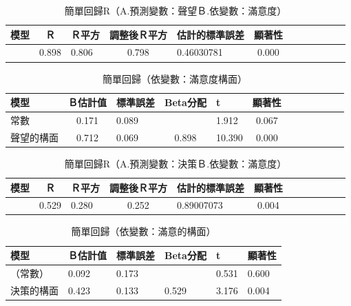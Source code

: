 \begin{table}[htb]
\caption{簡單回歸R（A.預測變數：聲望Ｂ.依變數：滿意度）}
\label{tab:HR6}
\centering
\renewcommand{\arraystretch}{1.2} %
\arrayrulewidth=1pt               %
\tabcolsep=10pt                   %
\begin{tabular}[t]{lclclclclclc|}  %
\hline
 模型&Ｒ&Ｒ平方&調整後Ｒ平方&估計的標準誤差&顯著性\\
\hline
&0.898&0.806&0.798&0.46030781&0.000\\
\hline
\end{tabular}
\end{table}

\begin{table}[htb]
\caption{簡單回歸（依變數：滿意度構面）}
\label{tab:H6}
\centering
\renewcommand{\arraystretch}{1.2} %
\arrayrulewidth=1pt               %
\tabcolsep=10pt                   %
\begin{tabular}[t]{lclclclclclc|}  %
\hline
 模型&Ｂ估計值&標準誤差&Beta分配&t&顯著性\\
\hline
常數&0.171&0.089&&1.912&0.067 \\
聲望的構面 & 0.712 & 0.069 & 0.898 & 10.390 & 0.000 \\
\hline
\end{tabular}
\end{table}


\begin{table}[htb]
\caption{簡單回歸R（A.預測變數：決策Ｂ.依變數：滿意度）}
\label{tab:HR7}
\centering
\renewcommand{\arraystretch}{1.2} %
\arrayrulewidth=1pt               %
\tabcolsep=10pt                   %
\begin{tabular}[t]{lclclclclclc|}  %
\hline
 模型&Ｒ&Ｒ平方&調整後Ｒ平方&估計的標準誤差&顯著性\\
\hline
&0.529&0.280&0.252&0.89007073&0.004\\
\hline
\end{tabular}
\end{table}

\begin{table}[htb]
\caption{簡單回歸（依變數：滿意的構面）}
\label{tab:H7}
\centering
\renewcommand{\arraystretch}{1.2} %
\arrayrulewidth=1pt               %
\tabcolsep=10pt                   %
\begin{tabular}[t]{llllll}  %
\hline
 模型&Ｂ估計值&標準誤差&Beta分配&t&顯著性\\
\hline
（常數）&0.092&0.173& &0.531&0.600\\
決策的構面&0.423&0.133&0.529&3.176&0.004\\
\hline
\end{tabular}
\end{table}


